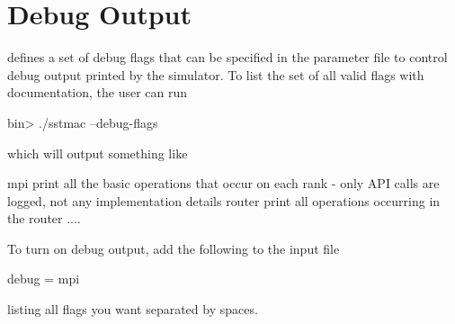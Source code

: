 
\section{Debug Output}
\label{sec:dbgoutput}
\sstmacro defines a set of debug flags that can be specified in the parameter file to control debug output printed by the simulator.
To list the set of all valid flags with documentation, the user can run

\begin{ShellCmd}
bin> ./sstmac --debug-flags
\end{ShellCmd}

which will output something like

\begin{ViFile}
    mpi
        print all the basic operations that occur on each rank - only API calls are
        logged, not any implementation details
    router
        print all operations occurring in the router
     ....
\end{ViFile}


To turn on debug output, add the following to the input file

\begin{ViFile}
debug = mpi 
\end{ViFile}
listing all flags you want separated by spaces.

